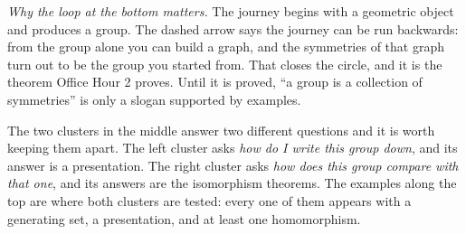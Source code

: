 \documentclass[10pt]{article}
\begin{document}
{\begin{minipage}[t]{744pt}
{}\par\vspace{4pt}
\begin{minipage}[t]{368pt}\vspace{0pt}
\begin{why}
\emph{Why the loop at the bottom matters.} The journey begins with a geometric object and produces a group. The dashed arrow says the journey can be run backwards: from the group alone you can build a graph, and the symmetries of that graph turn out to be the group you started from. That closes the circle, and it is the theorem Office Hour 2 proves. Until it is proved, ``a group is a collection of symmetries'' is only a slogan supported by examples.
\end{why}
\end{minipage}\hfill
\begin{minipage}[t]{360pt}\vspace{0pt}
\begin{bigpic}
The two clusters in the middle answer two different questions and it is worth keeping them apart. The left cluster asks \emph{how do I write this group down}, and its answer is a presentation. The right cluster asks \emph{how does this group compare with that one}, and its answers are the isomorphism theorems. The examples along the top are where both clusters are tested: every one of them appears with a generating set, a presentation, and at least one homomorphism.
\end{bigpic}
\end{minipage}
\end{minipage}
}
\end{document}
